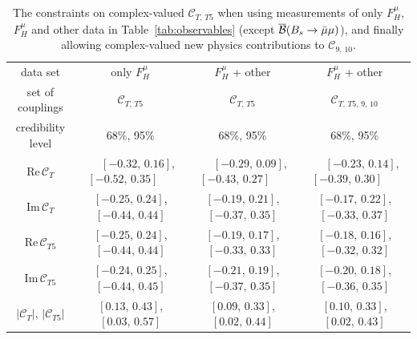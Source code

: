 \documentclass[twocolumn,epjc3]{svjour3}
\numberwithin{equation}{section}
\def \reftab#1{Table~\ref{#1}}
\newcommand{\fred}[1]{{\color{green}{#1}}}
\newcommand{\checked}[1]{{\color{brown}{ {\bf Checked: }{#1}}}}
\renewcommand{\checked}[1]{#1}
\newcommand{\wilson}[2][{}]{\mathcal{C}_{#2}^{\mathrm{#1}}}
\renewcommand{\[}{\big[}
\renewcommand{\]}{\big]}
\renewcommand{\(}{\big(}
\renewcommand{\)}{\big)}
\begin{document}
\begin{table}
  \renewcommand{\arraystretch}{1.3}
  \begin{center}
  \begin{tabular}{cccc}
  \hline
  data set
  & only $F_H^\mu$
  & $F_H^\mu$ + other
  & $F_H^\mu$ + other
  \\
  set of couplings
  & $\wilson{T,\,T5}$
  & $\wilson{T,\,T5}$
  & $\wilson{T,\,T5,\, 9,\,10}$
  \\
  credibility level
  & 68\%, 95\%
  & 68\%, 95\%
  & 68\%, 95\%
  \\
  \hline
  $\mbox{Re}\,\wilson{T}$
  & $\quad$ $[-0.32,\, 0.16]$, $[-0.52,\, 0.35]$ $\quad$
  & $\quad$ $[-0.29,\, 0.09]$, $[-0.43,\, 0.27]$ $\quad$
  & $\quad$ $[-0.23,\, 0.14]$, $[-0.39,\, 0.30]$ $\quad$
  \\
  $\mbox{Im}\,\wilson{T}$
  & $[-0.25,\, 0.24]$, $[-0.44,\, 0.44]$
  & $[-0.19,\, 0.21]$, $[-0.37,\, 0.35]$
  & $[-0.17,\, 0.22]$, $[-0.33,\, 0.37]$
  \\[0.1cm]
  $\mbox{Re}\,\wilson{T5}$
  & $[-0.25,\, 0.24]$, $[-0.44,\, 0.44]$
  & $[-0.19,\, 0.17]$, $[-0.33,\, 0.33]$
  & $[-0.18,\, 0.16]$, $[-0.32,\, 0.32]$
  \\
  $\mbox{Im}\,\wilson{T5}$
  & $[-0.24,\, 0.25]$, $[-0.44,\, 0.45]$
  & $[-0.21,\, 0.19]$, $[-0.37,\, 0.35]$
  & $[-0.20,\, 0.18]$, $[-0.36,\, 0.35]$
  \\
  \hline
  $|\wilson{T}|$, $|\wilson{T5}|$
  & $[0.13,\, 0.43]$, $[0.03,\, 0.57]$
  & $[0.09,\, 0.33]$, $[0.02,\, 0.44]$
  & $[0.10,\, 0.33]$, $[0.02,\, 0.43]$
  \\
  \hline
  \end{tabular}

  \end{center}

  \renewcommand{\arraystretch}{1.0}
  \caption{
     \label{tab:cTT5:1-dimCLs}
     The constraints on complex-valued $\wilson{T,\,T5}$ when using
     measurements of only $F_H^\mu$, $F_H^\mu$ and other data in
     \reftab{tab:observables} (except $\overline{\cal B}(B_s \to \bar\mu\mu)$), and finally allowing
     complex-valued new physics contributions to $\wilson{9,\,10}$. \checked{} %
   }
\end{table}
\end{document}
